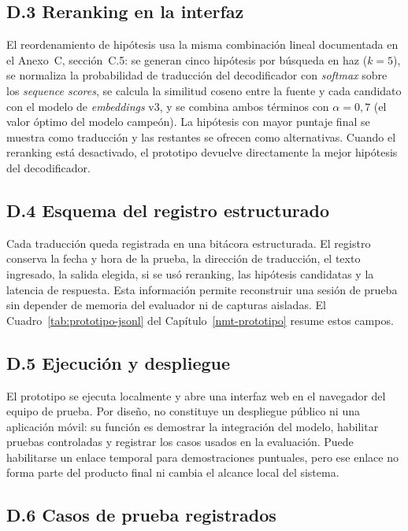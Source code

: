 \documentclass[12pt,a4paper,oneside]{book}
\begin{document}
\subsection*{D.3 Reranking en la interfaz}\label{anexo-prototipo-rerank}

El reordenamiento de hipótesis usa la misma combinación lineal documentada en el Anexo~C, sección~C.5: se generan cinco hipótesis por búsqueda en haz (\(k=5\)), se normaliza la probabilidad de traducción del decodificador con \emph{softmax} sobre los \emph{sequence scores}, se calcula la similitud coseno entre la fuente y cada candidato con el modelo de \emph{embeddings} v3, y se combina ambos términos con \(\alpha=0{,}7\) (el valor óptimo del modelo campeón). La hipótesis con mayor puntaje final se muestra como traducción y las restantes se ofrecen como alternativas. Cuando el reranking está desactivado, el prototipo devuelve directamente la mejor hipótesis del decodificador.

\subsection*{D.4 Esquema del registro estructurado}\label{anexo-prototipo-registro}

Cada traducción queda registrada en una bitácora estructurada. El registro conserva la fecha y hora de la prueba, la dirección de traducción, el texto ingresado, la salida elegida, si se usó reranking, las hipótesis candidatas y la latencia de respuesta. Esta información permite reconstruir una sesión de prueba sin depender de memoria del evaluador ni de capturas aisladas. El Cuadro~\ref{tab:prototipo-jsonl} del Capítulo~\ref{nmt-prototipo} resume estos campos.

\subsection*{D.5 Ejecución y despliegue}\label{anexo-prototipo-ejecucion}

El prototipo se ejecuta localmente y abre una interfaz web en el navegador del equipo de prueba. Por diseño, no constituye un despliegue público ni una aplicación móvil: su función es demostrar la integración del modelo, habilitar pruebas controladas y registrar los casos usados en la evaluación. Puede habilitarse un enlace temporal para demostraciones puntuales, pero ese enlace no forma parte del producto final ni cambia el alcance local del sistema.

\subsection*{D.6 Casos de prueba registrados}\label{anexo-prototipo-casos}
\end{document}

